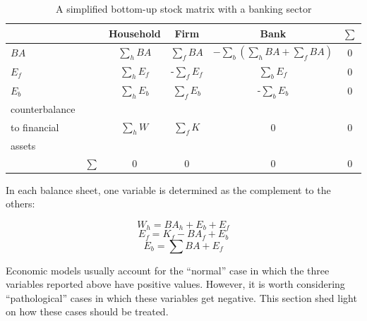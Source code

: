 \documentclass{article}
\begin{document}
\begin{table}[htp]
\begin{center}
\begin{tabular}{l c c c c c}
	\hline
&	& Household 	& \parbox{1.5cm}{\centerline{Firm}}   & \parbox{1.5cm}{\centerline{Bank}} &$\sum$\\
\hline
\hline
$BA$	&	&$\sum_h BA$	&$\sum_f BA$	&$-\sum_b (\sum_h BA+\sum_f BA)$	&0\\
$E_f$	&	&$\sum_h E_f$	&-$\sum_f E_f$	&$\sum_b E_f$	&0\\
$E_b$	&	&$\sum_h E_b$	&$\sum_f E_b$	&-$\sum_b E_b$	&0\\
	\hline
counterbalance	&&		&	&	&\\
to financial	&&	$\sum_hW$	&$\sum_fK$	&0	&0\\
assets	&&		&	&	&\\
	\hline
	\hline
&$\sum$	&	0	&0	&0	&0\\
\end{tabular}
\end{center}
\caption{A simplified bottom-up stock matrix with a banking sector}
\label{table:simplified}
\end{table}



In each balance sheet, one variable is determined as the complement to the others:

\[
W_h=BA_h+E_b+E_f
\]
\[
E_f=K_f-BA_f+E_b
\]
\[
E_b=\sum BA+E_f
\]

Economic models usually account for the ``normal'' case in which the three variables reported above have positive values. However, it is worth considering ``pathological'' cases in which these variables get negative. This section shed light on how these cases should be treated.  

\newpage 
\end{document}
